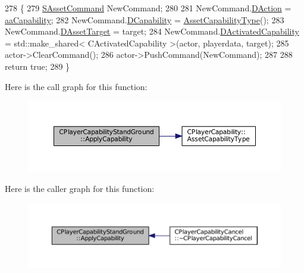 \begin{DoxyCode}
278                                                                                                            
                                                               \{
279     \hyperlink{structSAssetCommand}{SAssetCommand} NewCommand;
280     
281     NewCommand.\hyperlink{structSAssetCommand_a8edd3b3d59a76d5514ba403bc8076a75}{DAction} = \hyperlink{GameDataTypes_8h_ab47668e651a3032cfb9c40ea2d60d670acf9fb164e8abd71c71f4a8c7fda360d4}{aaCapability};
282     NewCommand.\hyperlink{structSAssetCommand_a734ea7c6847457b437360f333f570ff9}{DCapability} = \hyperlink{classCPlayerCapability_a433bb196cd6ab6a932f1cac102b3aa98}{AssetCapabilityType}();
283     NewCommand.\hyperlink{structSAssetCommand_a3d9b43f6e59c386c48c41a65448a0c39}{DAssetTarget} = target;
284     NewCommand.\hyperlink{structSAssetCommand_ad8beda19520811cc70fe1eab16c774dd}{DActivatedCapability} = std::make\_shared< CActivatedCapability >(actor, 
      playerdata, target);
285     actor->ClearCommand();
286     actor->PushCommand(NewCommand);
287 
288     \textcolor{keywordflow}{return} \textcolor{keyword}{true};
289 \}
\end{DoxyCode}
Here is the call graph for this function\+:\nopagebreak
\begin{figure}[H]
\begin{center}
\leavevmode
\includegraphics[width=350pt]{classCPlayerCapabilityStandGround_a3e1beee9125b2a940f803c3234866bb2_cgraph}
\end{center}
\end{figure}
Here is the caller graph for this function\+:\nopagebreak
\begin{figure}[H]
\begin{center}
\leavevmode
\includegraphics[width=350pt]{classCPlayerCapabilityStandGround_a3e1beee9125b2a940f803c3234866bb2_icgraph}
\end{center}
\end{figure}
\hypertarget{classCPlayerCapabilityStandGround_a468f2618edaebf2088b5917d2688b6f6}{}\label{classCPlayerCapabilityStandGround_a468f2618edaebf2088b5917d2688b6f6} 
